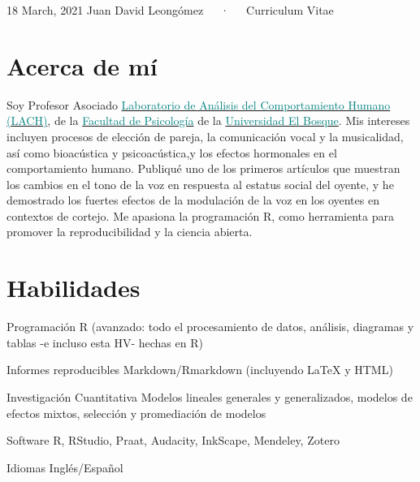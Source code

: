 \documentclass[11pt, a4paper]{awesome-cv}
\begin{document}
\makecvheader

\makecvfooter
  {18 March, 2021}
    {Juan David Leongómez~~~·~~~Curriculum Vitae}
  {\thepage}





\hypertarget{acerca-de-muxed}{%
\section{Acerca de mí}\label{acerca-de-muxed}}

Soy Profesor Asociado
\href{https://sites.google.com/unbosque.edu.co/lach-es}{\textcolor{teal}{Laboratorio de Análisis del Comportamiento Humano (LACH)}},
de la
\href{https://www.uelbosque.edu.co/psicologia}{\textcolor{teal}{Facultad de Psicología}}
de la
\href{https://www.uelbosque.edu.co/}{\textcolor{teal}{Universidad El Bosque}}.
Mis intereses incluyen procesos de elección de pareja, la comunicación
vocal y la musicalidad, así como bioacústica y psicoacústica,y los
efectos hormonales en el comportamiento humano. Publiqué uno de los
primeros artículos que muestran los cambios en el tono de la voz en
respuesta al estatus social del oyente, y he demostrado los fuertes
efectos de la modulación de la voz en los oyentes en contextos de
cortejo. Me apasiona la programación R, como herramienta para promover
la reproducibilidad y la ciencia abierta.

\hypertarget{habilidades}{%
\section{Habilidades}\label{habilidades}}

\begin{cvskills}
  \cvskill
    {Programación}
    {R (avanzado: todo el procesamiento de datos, análisis, diagramas y tablas -e incluso esta HV- hechas en R)}

  \cvskill
    {Informes reproducibles}
    {Markdown/Rmarkdown (incluyendo {\selectfont\LaTeX} y HTML)}

  \cvskill
    {Investigación Cuantitativa}
    {Modelos lineales generales y generalizados, modelos de efectos mixtos, selección y promediación de modelos}

  \cvskill
    {Software}
    {R, RStudio, Praat, Audacity, InkScape, Mendeley, Zotero}

  \cvskill
    {Idiomas}
    {Inglés/Español}
\end{cvskills}
\end{document}
